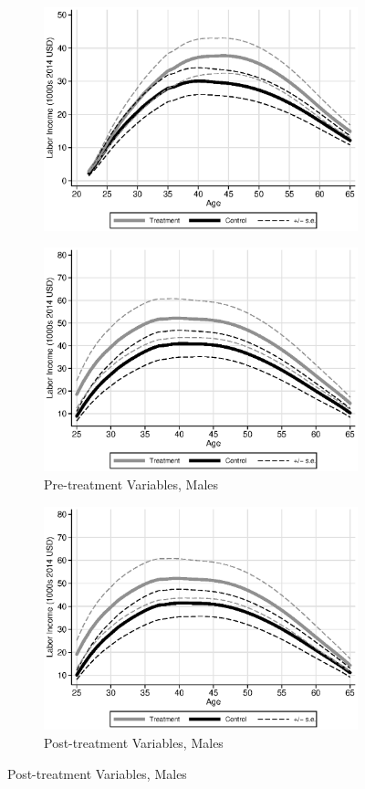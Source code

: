\begin{figure}
\begin{subfigure}[h]{0.3\textwidth}
		\includegraphics[width=\textwidth]{output/labor_25-65_pset1_mset3_female_sensitivity.eps}
\end{subfigure}
\begin{subfigure}[h]{0.3\textwidth}
		\centering
		\caption{Pre-treatment Variables, Males}
		\includegraphics[width=\textwidth]{output/labor_25-65_pset1_mset1_male.eps}
\end{subfigure}%
\begin{subfigure}[h]{0.3\textwidth}
	\centering
	\caption{Post-treatment Variables, Males}
		\includegraphics[width=\textwidth]{output/labor_25-65_pset1_mset2_male.eps}

\end{subfigure}
\end{figure}

